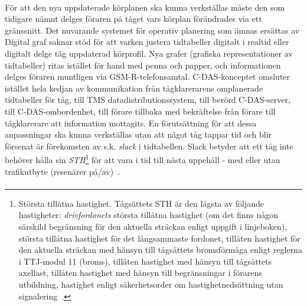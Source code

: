 \paragraph{}
\hspace{-11}För att den nya uppdaterade körplanen ska kunna verkställas måste den som tidigare nämnt delges föraren på tåget vars körplan förändrades via ett gränssnitt.
Det nuvarande systemet för operativ planering som ämnas ersättas av Digital graf saknar stöd för att varken justera tidtabeller digitalt i realtid eller digitalt delge tåg uppdaterad körprofil.
Nya grafer (grafiska representationer av tidtabeller) ritas istället för hand med penna och papper, och informationen delges föraren muntligen via GSM-R-telefonsamtal.
C-DAS-konceptet omsluter istället hela kedjan av kommunikation från tågklarerarens omplanerade tidtabeller för tåg, till TMS datadistributionssystem, till berörd C-DAS-server, till C-DAS-ombordenhet, till förare tillbaka med bekräftelse från förare till tågklarerare att information mottagits.
En förutsättning för att dessa anpassningar ska kunna verkställas utan att något tåg tappar tid och blir försenat är förekomsten av s.k. \emph{slack} i tidtabellen.
Slack betyder att ett tåg inte behöver hålla sin \emph{STH}\footnote{Största tillåtna hastighet. Tågsättets STH är den lägsta av följande hastigheter: \emph{drivfordonets} största tillåtna hastighet (om det finns någon särskild begränsning för den aktuella sträckan enligt uppgift i linjeboken), största tillåtna hastighet för det långsammaste fordonet, tillåten hastighet för den aktuella sträckan med hänsyn till tågsättets bromsförmåga enligt reglerna i TTJ-modul 11 (broms), tillåten hastighet med hänsyn till tågsättets axellast, tillåten hastighet med hänsyn till begränsningar i förarens utbildning, hastighet enligt säkerhetsorder om hastighetnedsättning utan signalering~\cite{TTJ2015}.} för att vara i tid till nästa uppehåll - med eller utan trafikutbyte (resenärer på/av)~\cite{Lindmark2022}.
\paragraph{}
